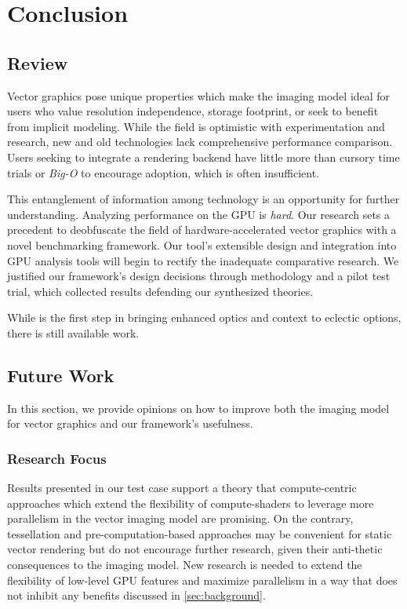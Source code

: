 \chapter{Conclusion}

\section{Review}\label{sec:conclusion}
Vector graphics pose unique properties which make the imaging model ideal for users who value resolution independence, storage footprint, or seek to benefit from implicit modeling. While the field is optimistic with experimentation and research, new and old technologies lack comprehensive performance comparison. Users seeking to integrate a rendering backend have little more than cursory time trials or \emph{Big-O} to encourage adoption, which is often insufficient.\medskip

This entanglement of information among technology is an opportunity for further understanding. Analyzing performance on the GPU is \emph{hard}. Our research sets a precedent to deobfuscate the field of hardware-accelerated vector graphics with a novel benchmarking framework. Our tool's extensible design and integration into GPU analysis tools will begin to rectify the inadequate comparative research. We justified our framework's design decisions through methodology and a pilot test trial, which collected results defending our synthesized theories.\medskip

While \toolname is the first step in bringing enhanced optics and context to eclectic options, there is still available work.\medskip

\section{Future Work}\label{sec:future_work}

In this section, we provide opinions on how to improve both the imaging model for vector graphics and our framework's usefulness.

\subsection{Research Focus}
Results presented in our test case support a theory that compute-centric approaches which extend the flexibility of compute-shaders to leverage more parallelism in the vector imaging model are promising. On the contrary, tessellation and pre-computation-based approaches may be convenient for static vector rendering but do not encourage further research, given their anti-thetic consequences to the imaging model. New research is needed to extend the flexibility of low-level GPU features and maximize parallelism in a way that does not inhibit any benefits discussed in \cref{sec:background}.

